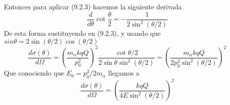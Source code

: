 Entonces para aplicar (9.2.3) hacemos la siguiente derivada
\begin{equation} \label{6.1.1}
    \frac{d}{d\theta} \cot\frac{\theta}{2} = -\frac{1}{2 \sin^2 (\theta/2)}
\end{equation} 
De esta forma sustituyendo en (9.2.3), y usando que $sin\theta = 2\sin(\theta/2) \cos(\theta/2)$
\begin{equation} \label{6.1.1}
    \frac{d\sigma(\theta)}{d\Omega} = \left(\frac{m_{\alpha} k qQ}{p_0^2}\right)^2 \frac{\cot\theta/2}{2\sin \theta \sin^2 (\theta/2)} = \left(\frac{m_{\alpha} k qQ}{2p_0^2 \sin^2(\theta/2)}\right)^2
\end{equation} 
Que conociendo que $E_0 = p_0^2/2 m_{\alpha}$ llegamos a 
\begin{equation} \label{6.1.1}
    \frac{d\sigma(\theta)}{d\Omega} = \left(\frac{k qQ}{4 E \sin^2(\theta/2)}\right)^2
\end{equation} 
